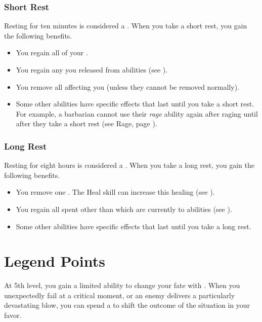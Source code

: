         \subsubsection{Short Rest}\label{Short Rest}
            Resting for ten minutes is considered a .
            When you take a short rest, you gain the following benefits.
            \begin{itemize}
                \item You regain all of your .
                \item You regain any  you released from  abilities (see ).
                \item You remove all  affecting you (unless they cannot be removed normally).
                \item Some other abilities have specific effects that last until you take a short rest.
                    For example, a barbarian cannot use their \textit{rage} ability again after raging until after they take a short rest (see Rage, page ).
            \end{itemize}

        \subsubsection{Long Rest}\label{Long Rest}
            Resting for eight hours is considered a .
            When you take a long rest, you gain the following benefits.
            \begin{itemize}
                \item You remove one .
                    The Heal skill can increase this healing (see ).
                \item You regain all spent  other than  which are currently  to abilities (see ).
                \item Some other abilities have specific effects that last until you take a long rest.
            \end{itemize}

\section{Legend Points}\label{Legend Points}
    At 5th level, you gain a limited ability to change your fate with .
    When you unexpectedly fail at a critical moment, or an enemy delivers a particularly devastating blow, you can spend a  to shift the outcome of the situation in your favor.

